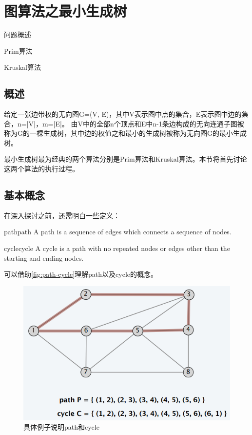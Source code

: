 \chapter{图算法之最小生成树}

\begin{introduction}
	\item 问题概述
	\item Prim算法
	\item Kruskal算法
\end{introduction}

\section{概述}
给定一张边带权的无向图G=(V, E)，其中V表示图中点的集合，E表示图中边的集合，n=|V|，m=|E|。
由V中的全部n个顶点和E中n-1条边构成的无向连通子图被称为G的一棵生成树，其中边的权值之和最小的生成树被称为无向图G的最小生成树。

最小生成树最为经典的两个算法分别是Prim算法和Kruskal算法。本节将首先讨论这两个算法的执行过程。

\section{基本概念}
在深入探讨之前，还需明白一些定义：

\begin{definition}{path}{path}
	A path is a sequence of edges which connects a sequence of nodes.
\end{definition}

\begin{definition}{cycle}{cycle}
	A cycle is a path with no repeated nodes or edges other than the
starting and ending nodes.
\end{definition}

可以借助\autoref{fig:path-cycle}理解path以及cycle的概念。

\begin{figure}[hbt]
	\centering
	\includegraphics[scale=0.5]{image/pathcycle.png}
	\caption{具体例子说明path和cycle}\label{fig:path-cycle}
\end{figure}

